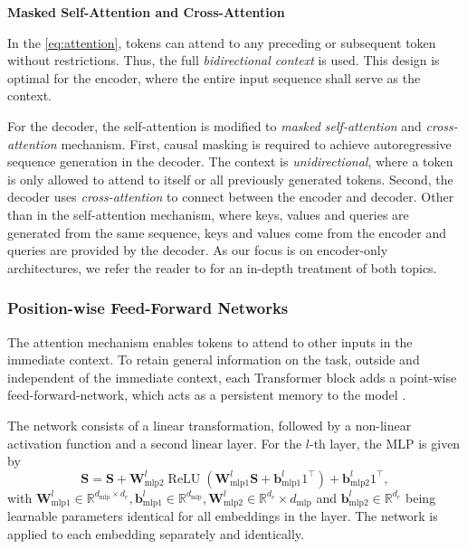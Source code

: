 \textbf{Masked Self-Attention and Cross-Attention}

In the \cref{eq:attention}, tokens can attend to any preceding or subsequent token without restrictions. Thus, the full \emph{bidirectional context} is used. This design is optimal for the encoder, where the entire input sequence shall serve as the context.

For the decoder, the self-attention is modified to \emph{masked self-attention} and \emph{cross-attention} mechanism. First, causal masking is required to achieve autoregressive sequence generation in the decoder. The context is \emph{unidirectional}, where a token is only allowed to attend to itself or all previously generated tokens. Second, the decoder uses \emph{cross-attention} to connect between the encoder and decoder. Other than in the self-attention mechanism, where keys, values and queries are generated from the same sequence, keys and values come from the encoder and queries are provided by the decoder. As our focus is on encoder-only architectures, we refer the reader to \textcite[][16--17]{raffelExploringLimitsTransfer2020} for an in-depth treatment of both topics.

\subsubsection{Position-wise Feed-Forward Networks}\label{sec:position-wise-ffn}

The attention mechanism enables \glspl{token} to attend to other inputs in the immediate context. To retain general information on the task, outside and independent of the immediate context, each Transformer block adds a point-wise \gls{feed-forward-network}, which acts as a persistent memory to the model \autocite[][3]{sukhbaatarAugmentingSelfattentionPersistent2019}.

The network consists of a linear transformation, followed by a non-linear activation function and a second linear layer. For the $l$-th layer, the \gls{MLP} is given by
\begin{equation}
    \mathbf{S} = \mathbf{S}+\mathbf{W}_{\mathrm{mlp} 2}^l \operatorname{ReLU}\left(\mathbf{W}_{\mathrm{mlp} 1}^l \mathbf{S}+\mathbf{b}_{\mathrm{mlp} 1}^l 1^{\top}\right)+\mathbf{b}_{\mathrm{mlp} 2}^l 1^{\top},
\end{equation}
with $\mathbf{W}_{\mathrm{mlp} 1}^l \in \mathbb{R}^{d_{\mathrm{mlp}} \times d_{e}}, \mathbf{b}_{\mathrm{mlp} 1}^l \in \mathbb{R}^{d_{\mathrm{mlp}}}, \mathbf{W}_{\mathrm{mlp} 2}^l \in \mathbb{R}^{d_{e}} \times d_{\mathrm{mlp}}$ and $\mathbf{b}_{\mathrm{mlp} 2}^l \in \mathbb{R}^{d_{e}}$ being learnable parameters identical for all \glspl{embedding} in the layer. The network is applied to each embedding separately and identically.


